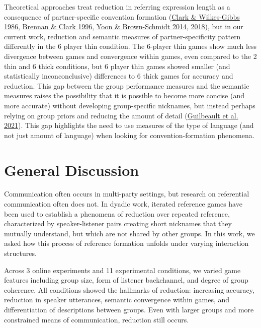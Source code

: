 \documentclass[
  english,
  a4paper,
]{article}
\begin{document}
Theoretical approaches treat reduction in referring expression length as a consequence of partner-specific convention formation (\protect\hyperlink{ref-clark1986}{Clark \& Wilkes-Gibbs 1986}, \protect\hyperlink{ref-brennan1996}{Brennan \& Clark 1996}, \protect\hyperlink{ref-yoon2014}{Yoon \& Brown-Schmidt 2014}, \protect\hyperlink{ref-yoon2018}{2018}), but in our current work, reduction and semantic measures of partner-specificity pattern differently in the 6 player thin condition. The 6-player thin games show much less divergence between games and convergence within games, even compared to the 2 thin and 6 thick conditions, but 6 player thin games showed smaller (and statistically inconconclusive) differences to 6 thick games for accuracy and reduction. This gap between the group performance measures and the semantic measures raises the possibility that it is possible to become more concise (and more accurate) without developing group-specific nicknames, but instead perhaps relying on group priors and reducing the amount of detail (\protect\hyperlink{ref-guilbeault2021}{Guilbeault et al. 2021}). This gap highlights the need to use measures of the type of language (and not just amount of language) when looking for convention-formation phenomena.

\hypertarget{general-discussion}{%
\section{General Discussion}\label{general-discussion}}

Communication often occurs in multi-party settings, but research on referential communication often does not. In dyadic work, iterated reference games have been used to establish a phenomena of reduction over repeated reference, characterized by speaker-listener pairs creating short nicknames that they mutually understand, but which are not shared by other groups. In this work, we asked how this process of reference formation unfolds under varying interaction structures.

Across 3 online experiments and 11 experimental conditions, we varied game features including group size, form of listener backchannel, and degree of group coherence. All conditions showed the hallmarks of reduction: increasing accuracy, reduction in speaker utterances, semantic convergence within games, and differentiation of descriptions between groups. Even with larger groups and more constrained means of communication, reduction still occurs.
\end{document}

